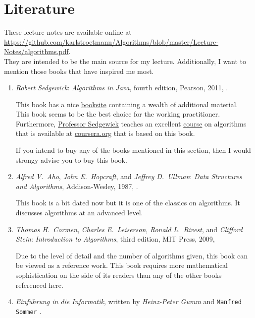 \section{Literature}
These lecture notes are available online at
\\[0.2cm]
\hspace*{-0.3cm}
\href{https://github.com/karlstroetmann/Algorithms/blob/master/Lecture-Notes/algorithms.pdf}{https://github.com/karlstroetmann/Algorithms/blob/master/Lecture-Notes/algorithms.pdf}.  
\\[0.2cm]
They are intended to be the main source for my lecture.  Additionally, I want
to mention those books that have inspired me most.
\begin{enumerate}
\item \textsl{Robert Sedgewick}: \emph{Algorithms in \textsl{Java}}, 
      fourth edition, Pearson, 2011, \cite{sedgewick:11}.
    
      This book has a nice \href{http://algs4.cs.princeton.edu/home/}{booksite} containing a wealth
      of additional material.  This book seems to be the best choice for the working practitioner.
      Furthermore, \href{http://www.cs.princeton.edu/~rs/}{Professor Sedgewick} teaches an excellent 
      \href{https://www.coursera.org/course/algs4partI}{course} on algorithms that is available at
      \href{https://www.coursera.org/}{coursera.org} that is based on this book.

      If you intend to buy any of the books mentioned in this section, then I would strongy advise
      you to buy this book.
\item \textsl{Alfred V.~Aho}, \textsl{John E.~Hopcraft}, and \textsl{Jeffrey D.~Ullman}:
      \emph{Data Structures and Algorithms}, Addison-Wesley, 1987, \cite{aho:87}.
      
      This book is a bit dated now but it is one of the classics on algorithms.  It discusses algorithms at an
      advanced level.
\item \textsl{Thomas H.~Cormen}, \textsl{Charles E.~Leiserson}, 
      \textsl{Ronald L.~Rivest}, and \textsl{Clifford Stein}:
      \emph{Introduction to Algorithms}, 
      third edition, MIT Press, 2009, \cite{cormen:09}

      Due to the level of detail and the number of algorithms given, this book can be viewed as a reference work.
      This book requires more mathematical sophistication on the side of its readers than any of the
      other books referenced here.  
\item \emph{Einf\"uhrung in die Informatik},
      written by \textsl{Heinz-Peter Gumm} and \texttt{Manfred Sommer} \cite{gumm:2008}.
      

\end{enumerate}
